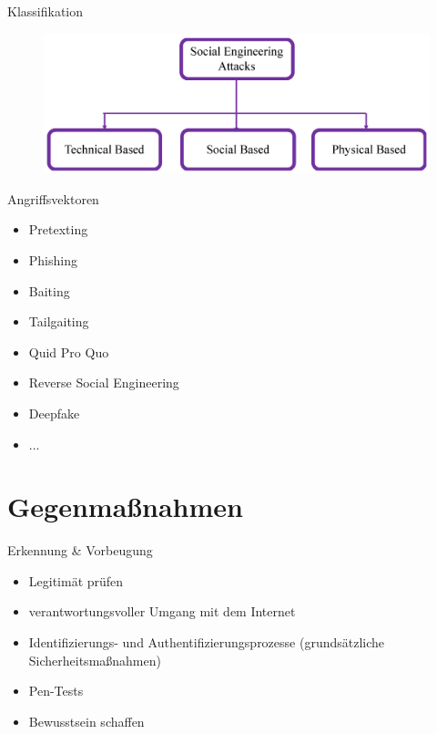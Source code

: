 \documentclass{beamer}
\begin{document}
\begin{frame}{Klassifikation}
    \begin{figure}[!htp]
        \centering
        \includegraphics[scale=.12]{Klassifikation.png}
    \end{figure}
    \begin{center}
    \end{center}
    \nocite{survey}
\end{frame}

\begin{frame}{Angriffsvektoren}
    \Large{
        \begin{itemize}
            \item Pretexting
            \item Phishing
            \item Baiting
            \item Tailgaiting
            \item Quid Pro Quo
            \item Reverse Social Engineering
            \item Deepfake
            \item ...
        \end{itemize}
    }
\end{frame}

\section{Gegenmaßnahmen}

\begin{frame}{Erkennung \& Vorbeugung}
    \Large{
        \begin{itemize}
            \item Legitimät prüfen
            \item verantwortungsvoller Umgang mit dem Internet
            \item Identifizierungs- und Authentifizierungsprozesse
            (grundsätzliche Sicherheitsmaßnahmen)
            \item Pen-Tests
            \item Bewusstsein schaffen
        \end{itemize}
    }
\end{frame}
\end{document}
